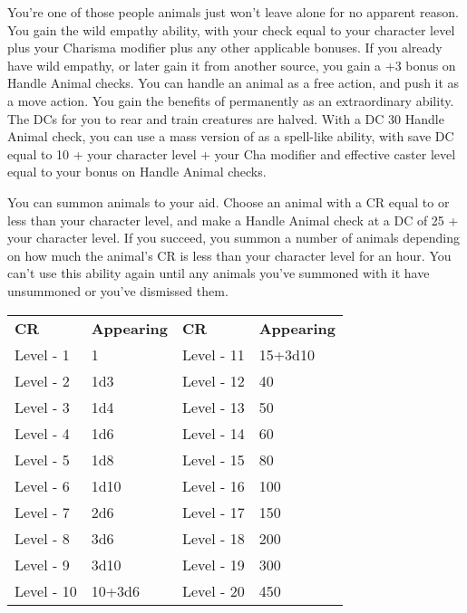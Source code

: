 {You're one of those people animals just won't leave alone for no apparent reason.}
{You gain the wild empathy ability, with your check equal to your character level plus your Charisma modifier plus any other applicable bonuses. If you already have wild empathy, or later gain it from another source, you gain a +3 bonus on Handle Animal checks.}
{You can handle an animal as a free action, and push it as a move action.}
{You gain the benefits of  permanently as an extraordinary ability. The DCs for you to rear and train creatures are halved.}
{With a DC 30 Handle Animal check, you can use a mass version of  as a spell-like ability, with save DC equal to 10 + \half your character level + your Cha modifier and effective caster level equal to your bonus on Handle Animal checks.}
{You can summon animals to your aid. Choose an animal with a CR equal to or less than your character level, and make a Handle Animal check at a DC of 25 + your character level. If you succeed, you summon a number of animals depending on how much the animal's CR is less than your character level for an hour. You can't use this ability again until any animals you've summoned with it have unsummoned or you've dismissed them.

\vspace{2pt}
\begin{tabular}{l l|l l}
	\textbf{CR} &\textbf{Appearing} &\textbf{CR} &\textbf{Appearing}\\
	Level - 1 &1   &Level - 11 &15+3d10\\
	Level - 2 &1d3 &Level - 12 &40\\
	Level - 3 &1d4 &Level - 13 &50\\
	Level - 4 &1d6 &Level - 14 &60\\
	Level - 5 &1d8 &Level - 15 &80\\
	Level - 6 &1d10 &Level - 16 &100\\
	Level - 7 &2d6 &Level - 17 &150\\
	Level - 8 &3d6 &Level - 18 &200\\
	Level - 9 &3d10 &Level - 19 &300 \\
	Level - 10 &10+3d6 &Level - 20 &450
\end{tabular}}
